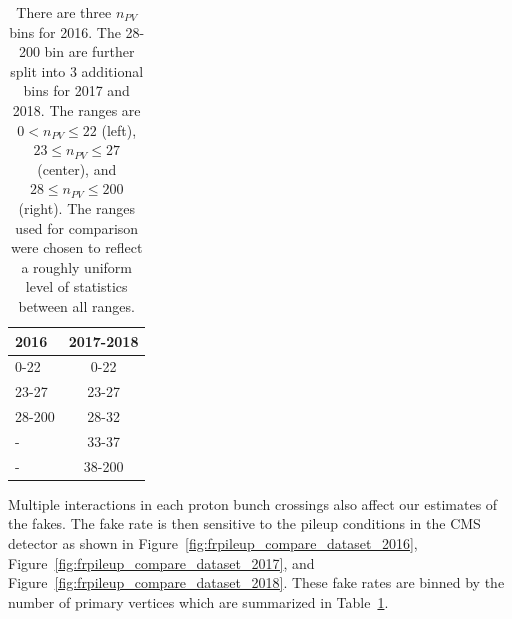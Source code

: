 \begin{table}[!htbp]
   \caption{There are three $n_{PV}$ bins for 2016. The 28-200 bin are further split into 3 additional bins for 2017 and 2018. The ranges are $0 \mathopen< n_{PV} \leq 22$ (left), $23 \leq n_{PV} \leq 27$ (center), and $28 \leq n_{PV} \leq 200$ (right). The ranges used for comparison were chosen to reflect a roughly uniform level of statistics between all ranges.}


       \centering
       \vspace{\baselineskip}
       \begin{tabular}{lc}
       \hline \hline
       2016 & 2017-2018\\
       \hline

       0-22 &  0-22 \\
       23-27 & 23-27 \\
       28-200 & 28-32 \\
       - & 33-37 \\
       - & 38-200\\

       \hline \hline
       \end{tabular}
       \label{table:nPV_bins}
\end{table}


Multiple interactions in each proton bunch crossings also affect our estimates of the fakes. The fake rate is then sensitive to the pileup conditions in the CMS detector as shown in Figure~\ref{fig:frpileup_compare_dataset_2016}, Figure~\ref{fig:frpileup_compare_dataset_2017}, and Figure~\ref{fig:frpileup_compare_dataset_2018}. These fake rates are binned by the number of primary vertices which are summarized in Table~\ref{table:nPV_bins}.

